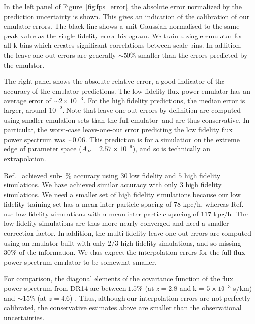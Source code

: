 \documentclass[a4paper,11pt]{article}
\begin{document}
In the left panel of Figure~\ref{fig:fps_error}, the absolute error normalized by the prediction uncertainty is shown. This gives an indication of the calibration of our emulator errors. The black line shows a unit Gaussian normalised to the same peak value as the single fidelity error histogram. We train a single emulator for all k bins which creates significant correlations between scale bins. In addition, the leave-one-out errors are generally $\sim 50\%$ smaller than the errors predicted by the emulator.

The right panel shows the absolute relative error, a good indicator of the accuracy of the emulator predictions.
The low fidelity flux power emulator has an average error of $\sim 2\times 10^{-3}$. For the high fidelity predictions, the median error is larger, around $10^{-2}$. Note that leave-one-out errors by definition are computed using smaller emulation sets than the full emulator, and are thus conservative. In particular, the worst-case leave-one-out error predicting the low fidelity flux power spectrum was $\sim 0.06$. This prediction is for a simulation on the extreme edge of parameter space ($A_P = 2.57\times10^{-9}$), and so is technically an extrapolation.

Ref.~\cite{Fernandez:2022} achieved sub-$1\%$ accuracy using $30$ low fidelity and $5$ high fidelity simulations. We have achieved similar accuracy with only $3$ high fidelity simulations. We need a smaller set of high fidelity simulations because our low fidelity training set has a mean inter-particle spacing of $78$ kpc/h, whereas Ref.~\cite{Fernandez:2022} use low fidelity simulations with a mean inter-particle spacing of $117$ kpc/h. The low fidelity simulations are thus more nearly converged and need a smaller correction factor. In addition, the multi-fidelity leave-one-out errors are computed using an emulator built with only $2/3$ high-fidelity simulations, and so missing $30\%$ of the information. We thus expect the interpolation errors for the full flux power spectrum emulator to be somewhat smaller.


For comparison, the diagonal elements of the covariance function of the flux power spectrum from DR14 are between $1.5\%$ (at $z=2.8$ and k = $5\times 10^{-3}$ s/km) and $\sim 15\%$ (at $z=4.6$) \cite{Chabanier:2019}. Thus, although our interpolation errors are not perfectly calibrated, the conservative estimates above are smaller than the observational uncertainties.
\end{document}
